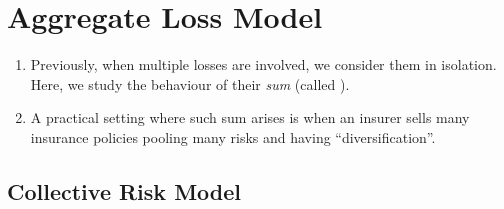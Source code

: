 \section{Aggregate Loss Model}
\label{sect:agg-loss-model}
\begin{enumerate}
\item Previously, when multiple losses are involved, we consider them in
isolation. Here, we study the behaviour of their \emph{sum} (called
).
\item A practical setting where such sum arises is when an insurer sells many
insurance policies  pooling many risks and having
``diversification''.
\end{enumerate}
\subsection{Collective Risk Model}
